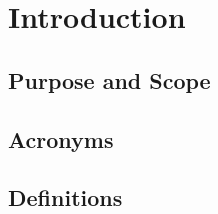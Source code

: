 \section{Introduction}

\subsection{Purpose and Scope}

\subsection{Acronyms}

\subsection{Definitions}

